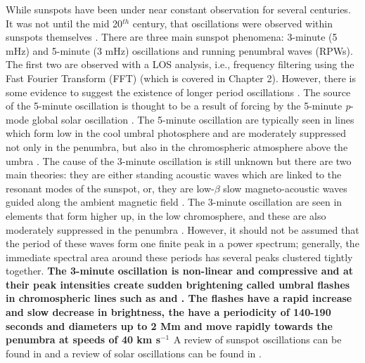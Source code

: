     While sunspots have been under near constant observation for several centuries.
    It was not until the mid 20$^{{th}}$ century, that oscillations were observed within sunspots themselves \citep{OASO}.
    There are three main sunspot phenomena: 3-minute (5 mHz) and 5-minute (3 mHz) oscillations and running penumbral waves (RPWs).
    The first two are observed with a LOS analysis, i.e., frequency filtering using the Fast Fourier Transform (FFT) (which is covered in Chapter 2).
    However, there is some evidence to suggest the existence of longer period oscillations \citep{LPO,SOS,Chorley2011}.
    The source of the 5-minute oscillation is thought to be a result of forcing by the 5-minute \textit{p}-mode global solar oscillation \citep{OWS,WAUO}.
    The 5-minute oscillation are typically seen in lines which form low in the cool umbral photosphere and are moderately suppressed not only in the penumbra, but also in the chromospheric atmosphere above the umbra \citep{OASO}.
    The cause of the 3-minute oscillation is still unknown but there are two main theories: they are either standing acoustic waves which are linked to the resonant modes of the sunspot, or, they are low-$\beta$ slow magneto-acoustic waves guided along the ambient magnetic field \citep{UTMO,OWS,OASO,ORWS}.
    The 3-minute oscillation are seen in elements that form higher up, in the low chromosphere, and these are also moderately suppressed in the penumbra \citep{OASO}.
    However, it should not be assumed that the period of these waves form one finite peak in a power spectrum; generally, the immediate spectral area around these periods has several peaks clustered tightly together.
	\textbf{The 3-minute oscillation is non-linear and compressive and at their peak intensities create sudden brightening called umbral flashes in chromospheric lines such as  and  \citep{1969SoPh....7..351B}.
    The flashes have a rapid increase and slow decrease in brightness, the have a periodicity of 140-190 seconds and diameters up to 2 Mm and move rapidly towards the penumbra at speeds of 40 km s$^{-1}$ \citep{2003A&A...403..277R}}
    A review of sunspot oscillations can be found in \cite{OASO} and a review of solar oscillations can be found in \cite{SO}.
    
